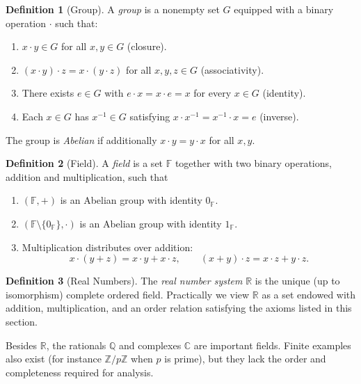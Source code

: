 \documentclass{article}
\theoremstyle{definition}
\newtheorem{definition}{Definition}[section]
\theoremstyle{plain}
\begin{document}
	\begin{definition}[Group]\label{def:group}
		A \emph{group} is a nonempty set $G$ equipped with a binary operation $\cdot$ such that:
		\begin{enumerate}
			\item $x\cdot y \in G$ for all $x,y \in G$ (closure).
			\item $(x\cdot y)\cdot z = x\cdot (y\cdot z)$ for all $x,y,z \in G$ (associativity).
			\item There exists $e \in G$ with $e\cdot x = x\cdot e = x$ for every $x \in G$ (identity).
			\item Each $x \in G$ has $x^{-1} \in G$ satisfying $x\cdot x^{-1} = x^{-1}\cdot x = e$ (inverse).
		\end{enumerate}
		The group is \emph{Abelian} if additionally $x\cdot y = y\cdot x$ for all $x,y$.
	\end{definition}

	\begin{definition}[Field]\label{def:field}
		A \emph{field} is a set $\mathbb{F}$ together with two binary operations, addition and multiplication, such that
		\begin{enumerate}
			\item $(\mathbb{F},+)$ is an Abelian group with identity $0_\mathbb{F}$.
			\item $(\mathbb{F}\setminus\{0_\mathbb{F}\},\cdot)$ is an Abelian group with identity $1_\mathbb{F}$.
			\item Multiplication distributes over addition:
			\[
				x\cdot (y+z) = x\cdot y + x\cdot z, \qquad (x+y)\cdot z = x\cdot z + y\cdot z.
			\]
		\end{enumerate}
	\end{definition}

	\begin{definition}[Real Numbers]\label{def:reals}
		The \emph{real number system} $\mathbb{R}$ is the unique (up to isomorphism) complete ordered field. Practically we view $\mathbb{R}$ as a set endowed with addition, multiplication, and an order relation satisfying the axioms listed in this section.
	\end{definition}

	Besides $\mathbb{R}$, the rationals $\mathbb{Q}$ and complexes $\mathbb{C}$ are important fields. Finite examples also exist (for instance $\mathbb{Z}/p\mathbb{Z}$ when $p$ is prime), but they lack the order and completeness required for analysis.
\end{document}
